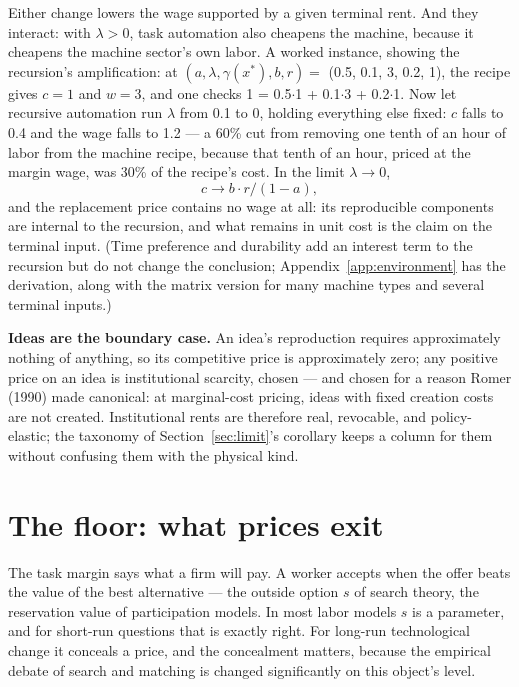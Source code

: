 \documentclass[12pt]{article}
\theoremstyle{plain}
\begin{document}
Either change lowers the wage supported by a given terminal rent. And they interact: with $\lambda > 0$, task automation also cheapens the machine, because it cheapens the machine sector's own labor. A worked instance, showing the recursion's amplification: at $(a, \lambda , \gamma (x^*), b, r) =$ (0.5, 0.1, 3, 0.2, 1), the recipe gives $c = 1$ and $w = 3$, and one checks 1 = 0.5$\cdot$1 + 0.1$\cdot$3 + 0.2$\cdot$1. Now let recursive automation run $\lambda$ from 0.1 to 0, holding everything else fixed: $c$ falls to 0.4 and the wage falls to 1.2 --- a 60\% cut from removing one tenth of an hour of labor from the machine recipe, because that tenth of an hour, priced at the margin wage, was 30\% of the recipe's cost. In the limit $\lambda \to 0$,
\begin{equation}\label{eq:lambda-zero}
c \to b\cdot r/(1 - a),
\end{equation}
and the replacement price contains no wage at all: its reproducible components are internal to the recursion, and what remains in unit cost is the claim on the terminal input. (Time preference and durability add an interest term to the recursion but do not change the conclusion; Appendix~\ref{app:environment} has the derivation, along with the matrix version for many machine types and several terminal inputs.)

\textbf{Ideas are the boundary case.} An idea's reproduction requires approximately nothing of anything, so its competitive price is approximately zero; any positive price on an idea is institutional scarcity, chosen --- and chosen for a reason Romer (1990) made canonical: at marginal-cost pricing, ideas with fixed creation costs are not created. Institutional rents are therefore real, revocable, and policy-elastic; the taxonomy of Section~\ref{sec:limit}'s corollary keeps a column for them without confusing them with the physical kind.

\section{The floor: what prices exit}\label{sec:floor}

The task margin says what a firm will pay. A worker accepts when the offer beats the value of the best alternative --- the outside option $s$ of search theory, the reservation value of participation models. In most labor models $s$ is a parameter, and for short-run questions that is exactly right. For long-run technological change it conceals a price, and the concealment matters, because the empirical debate of search and matching is changed significantly on this object's level.
\end{document}
